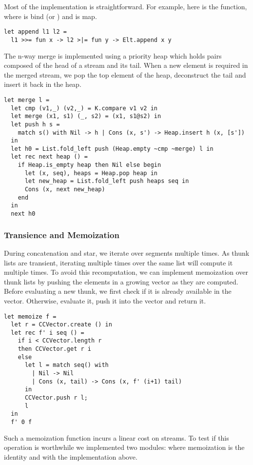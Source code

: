 Most of the implementation is straightforward. For example, here is the
 function, where \code{>>=} is bind (or )
and \code{>|=} is map.

\begin{lstlisting}
let append l1 l2 =
  l1 >>= fun x -> l2 >|= fun y -> Elt.append x y
\end{lstlisting}

The n-way merge is implemented using a priority heap which holds pairs composed
of the head of a stream and its tail. When a new element is required in the
merged stream, we pop the top element of the heap, deconstruct
the tail and insert it back in the heap.

\begin{lstlisting}
let merge l =
  let cmp (v1,_) (v2,_) = K.compare v1 v2 in
  let merge (x1, s1) (_, s2) = (x1, s1@s2) in
  let push h s =
    match s() with Nil -> h | Cons (x, s') -> Heap.insert h (x, [s'])
  in
  let h0 = List.fold_left push (Heap.empty ~cmp ~merge) l in
  let rec next heap () =
    if Heap.is_empty heap then Nil else begin
      let (x, seq), heaps = Heap.pop heap in
      let new_heap = List.fold_left push heaps seq in
      Cons (x, next new_heap)
    end
  in
  next h0
\end{lstlisting}

\subsubsection{Transience and Memoization}

During concatenation and star, we iterate over segments multiple times.
As thunk lists are transient, iterating multiple times over the same list
will compute it multiple times. To avoid this recomputation, we can implement memoization
over thunk lists by pushing the elements in a growing vector as they are
computed. Before evaluating a new thunk, we first check if it is already available
in the vector. Otherwise, evaluate it, push it into the vector and return it.
\begin{lstlisting}
let memoize f =
  let r = CCVector.create () in
  let rec f' i seq () =
    if i < CCVector.length r
    then CCVector.get r i
    else 
      let l = match seq() with
        | Nil -> Nil
        | Cons (x, tail) -> Cons (x, f' (i+1) tail)
      in
      CCVector.push r l;
      l
  in
  f' 0 f
\end{lstlisting}

Such a memoization function incurs a linear cost on streams. To test
if this operation is worthwhile we implemented two modules:
 where memoization is the identity and 
with the implementation above.

